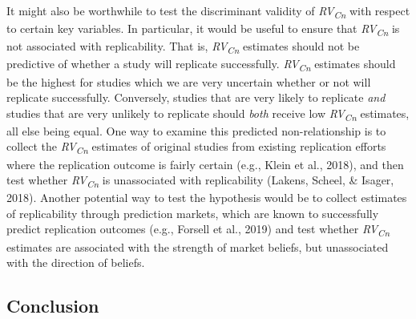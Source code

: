 \documentclass[
  man,floatsintext]{apa6}
\begin{document}
It might also be worthwhile to test the discriminant validity of \emph{RV\textsubscript{Cn}} with respect to certain key variables. In particular, it would be useful to ensure that \emph{RV\textsubscript{Cn}} is not associated with replicability. That is, \emph{RV\textsubscript{Cn}} estimates should not be predictive of whether a study will replicate successfully. \emph{RV\textsubscript{Cn}} estimates should be the highest for studies which we are very uncertain whether or not will replicate successfully. Conversely, studies that are very likely to replicate \emph{and} studies that are very unlikely to replicate should \emph{both} receive low \emph{RV\textsubscript{Cn}} estimates, all else being equal. One way to examine this predicted non-relationship is to collect the \emph{RV\textsubscript{Cn}} estimates of original studies from existing replication efforts where the replication outcome is fairly certain (e.g., Klein et al., 2018), and then test whether \emph{RV\textsubscript{Cn}} is unassociated with replicability (Lakens, Scheel, \& Isager, 2018). Another potential way to test the hypothesis would be to collect estimates of replicability through prediction markets, which are known to successfully predict replication outcomes (e.g., Forsell et al., 2019) and test whether \emph{RV\textsubscript{Cn}} estimates are associated with the strength of market beliefs, but unassociated with the direction of beliefs.

\hypertarget{conclusion}{%
\subsection{Conclusion}\label{conclusion}}
\end{document}
